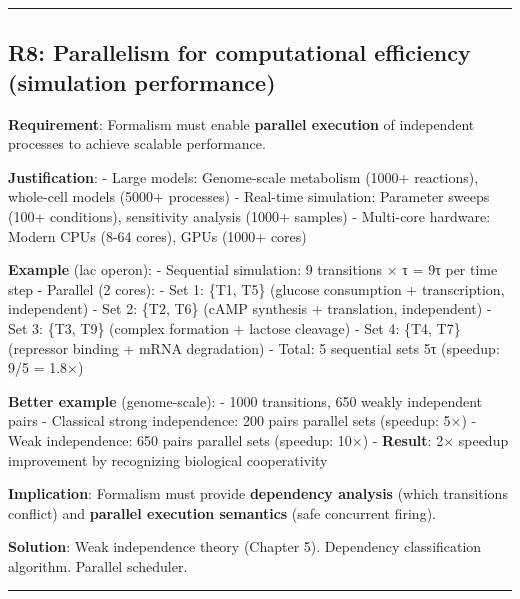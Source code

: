\begin{center}\rule{0.5\linewidth}{0.5pt}\end{center}

\hypertarget{r8-parallelism-for-computational-efficiency-simulation-performance}{%
\subsection{\texorpdfstring{\textbf{R8: Parallelism for computational
efficiency} (simulation
performance)}{R8: Parallelism for computational efficiency (simulation performance)}}\label{r8-parallelism-for-computational-efficiency-simulation-performance}}

\textbf{Requirement}: Formalism must enable \textbf{parallel execution}
of independent processes to achieve scalable performance.

\textbf{Justification}: - Large models: Genome-scale metabolism (1000+
reactions), whole-cell models (5000+ processes) - Real-time simulation:
Parameter sweeps (100+ conditions), sensitivity analysis (1000+ samples)
- Multi-core hardware: Modern CPUs (8-64 cores), GPUs (1000+ cores)

\textbf{Example} (lac operon): - Sequential simulation: 9 transitions ×
τ = 9τ per time step - Parallel (2 cores): - Set 1: \{T1, T5\} (glucose
consumption + transcription, independent) - Set 2: \{T2, T6\} (cAMP
synthesis + translation, independent) - Set 3: \{T3, T9\} (complex
formation + lactose cleavage) - Set 4: \{T4, T7\} (repressor binding +
mRNA degradation) - Total: 5 sequential sets \textrightarrow 5τ (speedup: 9/5 = 1.8×)

\textbf{Better example} (genome-scale): - 1000 transitions, 650 weakly
independent pairs - Classical strong independence: 200 pairs 
parallel sets (speedup: 5×) - Weak independence: 650 pairs  parallel
sets (speedup: 10×) - \textbf{Result}: 2× speedup improvement by
recognizing biological cooperativity

\textbf{Implication}: Formalism must provide \textbf{dependency
analysis} (which transitions conflict) and \textbf{parallel execution
semantics} (safe concurrent firing).

\textbf{Solution}: Weak independence theory (Chapter 5). Dependency
classification algorithm. Parallel scheduler.

\begin{center}\rule{0.5\linewidth}{0.5pt}\end{center}

